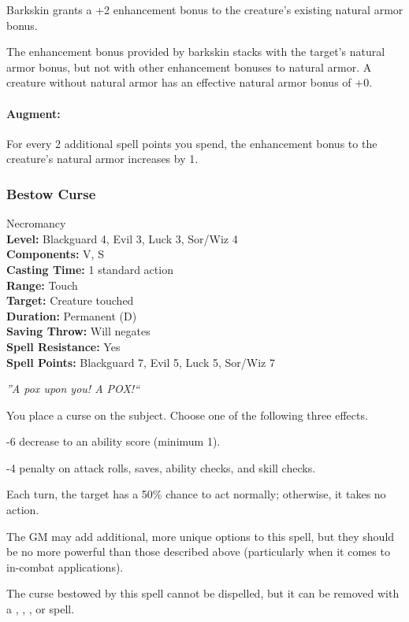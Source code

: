 Barkskin grants a +2 enhancement bonus to the creature's existing natural armor bonus.

The enhancement bonus provided by barkskin stacks with the target's natural armor bonus, but not with other enhancement bonuses to natural armor. A creature without natural armor has an effective natural armor bonus of +0.

\paragraph{Augment:} For every 2 additional spell points you spend, the enhancement bonus to the creature's natural armor increases by 1.
\subsubsection{Bestow Curse}
\label{Spell:BestowCurse}
Necromancy
\\ \textbf{Level:} Blackguard 4, Evil 3, Luck 3, Sor/Wiz 4
\\ \textbf{Components:} V, S
\\ \textbf{Casting Time:} 1 standard action
\\ \textbf{Range:} Touch
\\ \textbf{Target:} Creature touched
\\ \textbf{Duration:} Permanent (D)
\\ \textbf{Saving Throw:} Will negates
\\ \textbf{Spell Resistance:} Yes
\\ \textbf{Spell Points:} Blackguard 7, Evil 5, Luck 5, Sor/Wiz 7

\emph{''A pox upon you! A POX!``}

You place a curse on the subject. Choose one of the following three effects.
\begin{list}{}{\leftmargin=1em}
 \item -6 decrease to an ability score (minimum 1).
 \item -4 penalty on attack rolls, saves, ability checks, and skill checks.
 \item Each turn, the target has a 50\% chance to act normally; otherwise, it takes no action.
\end{list}
The GM may add additional, more unique options to this spell, 
but they should be no more powerful than those described above (particularly when it comes to in-combat applications).

The curse bestowed by this spell cannot be dispelled, but it can be removed with a , , , or  spell.

